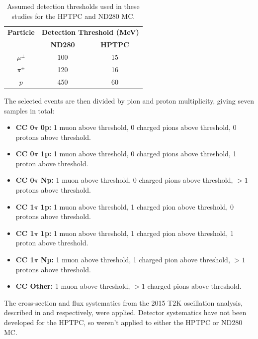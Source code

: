 \begin{center}
\begin{table}
\center
\begin{tabular}{c ||c c}
\hline \hline
\textbf{Particle} & \multicolumn{2}{c}{\textbf{Detection Threshold (MeV)}}\\
 & \textbf{ND280} & \textbf{HPTPC} \\
 \hline \hline
$\mu^{\pm}$ & 100 & 15 \\
$\pi^{\pm}$ & 120 & 16 \\
$p$ & 450 & 60 \\
\hline \hline
\end{tabular}
\caption{Assumed detection thresholds used in these studies for the HPTPC and ND280 MC.}
\label{tab:hptpcthresh}
\end{table}
\end{center}

The selected events are then divided by pion and proton multiplicity, giving seven samples in total:

\begin{itemize}

\item \textbf{CC 0$\pi$ 0p:} 1 muon above threshold, 0 charged pions above threshold, 0 protons above threshold.

\item \textbf{CC 0$\pi$ 1p:} 1 muon above threshold, 0 charged pions above threshold, 1 proton above threshold.

\item \textbf{CC 0$\pi$ Np:} 1 muon above threshold, 0 charged pions above threshold, $>1$ protons above threshold.

\item \textbf{CC 1$\pi$ 1p:} 1 muon above threshold, 1 charged pion above threshold, 0 protons above threshold.

\item \textbf{CC 1$\pi$ 1p:} 1 muon above threshold, 1 charged pion above threshold, 1 proton above threshold.

\item \textbf{CC 1$\pi$ Np:} 1 muon above threshold, 1 charged pion above threshold, $>1$ protons above threshold.

\item \textbf{CC Other:} 1 muon above threshold, $>1$ charged pions above threshold.

\end{itemize}

The cross-section and flux systematics from the 2015 T2K oscillation analysis, described in \cite{tn265} and \cite{tn217} respectively, were applied. Detector systematics have not been developed for the HPTPC, so weren't applied to either the HPTPC or ND280 MC.

